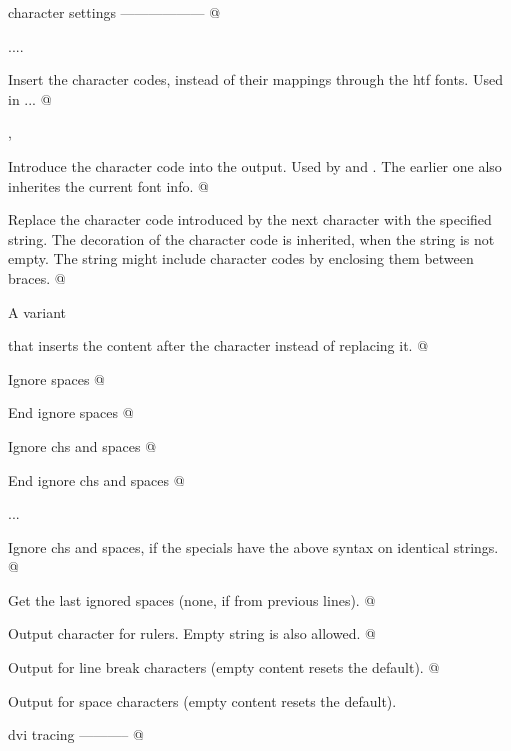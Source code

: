 {                                                    character settings
                                                    ------------------
  @    ....
           Insert the character codes, instead of their mappings through
           the htf fonts.  Used in \JavaScript...
  @    , 
           Introduce the character code into the output.
           Used by  and . The earlier one
           also inherites the current font info.
  @    
           Replace the character code introduced by the next character
           with the specified string.  The decoration of the character 
           code is inherited, when the string is not empty. The string
           might include character codes by enclosing them between braces.  
  @    
           A variant  that inserts the content
           after the character instead of replacing it.
  @    
           Ignore spaces
  @     
           End ignore spaces
  @    \special{t4ht@[}
           Ignore chs and spaces
  @    \special{t4ht@]}
           End ignore chs and spaces
  @    \special{t4ht@[...}...\special{t4ht@]...}
           Ignore chs and spaces, if the specials  have the above
           syntax on identical strings.
  @    
           Get the last ignored spaces (none, if from previous lines).
  @    
           Output character for rulers. Empty string is also allowed.
  @    
           Output for line break characters (empty
                                         content resets the default).
  @    
           Output for space characters (empty content resets the default).

                                                    dvi tracing
                                                    -----------
  @    \special{t4ht@%
           Request dvi tracing.

               X  x
               P  p      groups
               C  c      characters
               H  h      horizontal spaces
               V  v      vertical spaces
               R  r      rulers
         
       \special{t4ht@%
       \special{t4ht@%
           Tailor dvi tracing

}}}}
